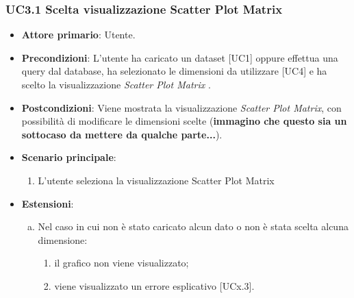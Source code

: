 \subsubsection{UC3.1 Scelta visualizzazione Scatter Plot Matrix}
\begin{figure}[h]
\centering
\caption{}
\end{figure}
\begin{itemize}
	\item \textbf{Attore primario}: Utente.
	\item \textbf{Precondizioni}: L'utente ha caricato un dataset [UC1] oppure effettua una query dal database, ha selezionato le dimensioni da utilizzare [UC4] e ha scelto la visualizzazione \textit{Scatter Plot Matrix} .
	\item \textbf{Postcondizioni}: Viene mostrata la visualizzazione \textit{Scatter Plot Matrix}, con possibilità di modificare le dimensioni scelte (\textbf{immagino che questo sia un sottocaso da mettere da qualche parte...}).
	\item \textbf{Scenario principale}:
		\begin{enumerate}
			\item L'utente seleziona la visualizzazione Scatter Plot Matrix
		\end{enumerate}
	\item \textbf{Estensioni}:
	\begin{enumerate}[(a)]
		\item Nel caso in cui non è stato caricato alcun dato o non è stata scelta alcuna dimensione:
		\begin{enumerate}[1.]
			\item il grafico non viene visualizzato;
			\item viene visualizzato un errore esplicativo [UCx.3].
		\end{enumerate}
	\end{enumerate}
\end{itemize}